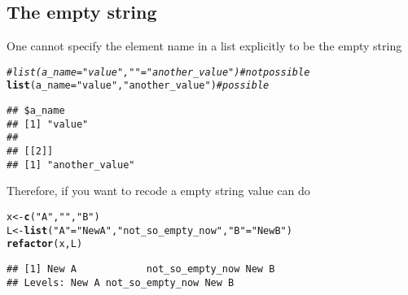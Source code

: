 \documentclass{article}\usepackage[]{graphicx}\usepackage[]{color}
\makeatletter
\newcommand{\hlstr}[1]{\textcolor[rgb]{0.192,0.494,0.8}{#1}}%
\newcommand{\hlcom}[1]{\textcolor[rgb]{0.678,0.584,0.686}{\textit{#1}}}%
\newcommand{\hlstd}[1]{\textcolor[rgb]{0.345,0.345,0.345}{#1}}%
\newcommand{\hlkwb}[1]{\textcolor[rgb]{0.69,0.353,0.396}{#1}}%
\newcommand{\hlkwc}[1]{\textcolor[rgb]{0.333,0.667,0.333}{#1}}%
\newcommand{\hlkwd}[1]{\textcolor[rgb]{0.737,0.353,0.396}{\textbf{#1}}}%
\newenvironment{kframe}{%
 \def\at@end@of@kframe{}%
 \ifinner\ifhmode%
  \def\at@end@of@kframe{\end{minipage}}%
  \begin{minipage}{\columnwidth}%
 \fi\fi%
 \def\FrameCommand##1{\hskip\@totalleftmargin \hskip-\fboxsep
 \colorbox{shadecolor}{##1}\hskip-\fboxsep
     \hskip-\linewidth \hskip-\@totalleftmargin \hskip\columnwidth}%
 \MakeFramed {\advance\hsize-\width
   \@totalleftmargin\z@ \linewidth\hsize
   \@setminipage}}%
 {\par\unskip\endMakeFramed%
 \at@end@of@kframe}
\newenvironment{knitrout}{}{} %
\makeatother
\begin{document}
\subsection{The empty string}
One cannot specify the element name in a list explicitly to be the empty string
\begin{knitrout}
\color{fgcolor}\begin{kframe}
\begin{alltt}
\hlcom{# list(a_name="value", ""="another_value") # not possible}
\hlkwd{list}\hlstd{(}\hlkwc{a_name}\hlstd{=}\hlstr{"value"}\hlstd{,} \hlstr{"another_value"}\hlstd{)} \hlcom{# possible}
\end{alltt}
\begin{verbatim}
## $a_name
## [1] "value"
## 
## [[2]]
## [1] "another_value"
\end{verbatim}
\end{kframe}
\end{knitrout}
Therefore, if you want to recode a empty string value can do
\begin{knitrout}
\color{fgcolor}\begin{kframe}
\begin{alltt}
\hlstd{x} \hlkwb{<-} \hlkwd{c}\hlstd{(}\hlstr{"A"}\hlstd{,} \hlstr{""}\hlstd{,} \hlstr{"B"}\hlstd{)}
\hlstd{L} \hlkwb{<-} \hlkwd{list}\hlstd{(}\hlstr{"A"}\hlstd{=}\hlstr{"New A"}\hlstd{,} \hlstr{"not_so_empty_now"}\hlstd{,} \hlstr{"B"}\hlstd{=}\hlstr{"New B"}\hlstd{)}
\hlkwd{refactor}\hlstd{(x, L)}
\end{alltt}
\begin{verbatim}
## [1] New A            not_so_empty_now New B           
## Levels: New A not_so_empty_now New B
\end{verbatim}
\end{kframe}
\end{knitrout}
\end{document}
